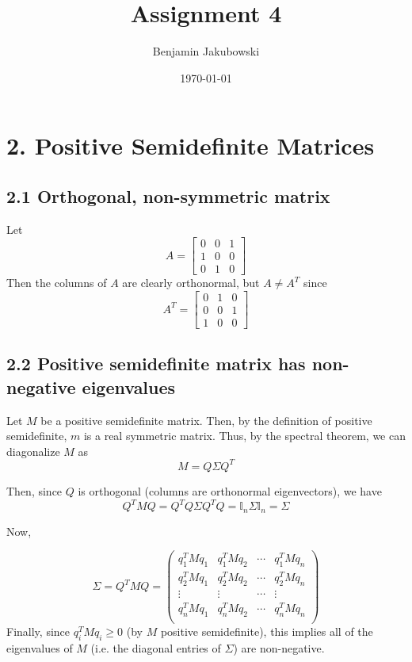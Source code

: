 \documentclass[paper=a4, fontsize=11pt]{scrartcl} %
\title{	Assignment 4}
\author{Benjamin Jakubowski} %
\date{\normalsize\today} %
\numberwithin{equation}{section} %
\numberwithin{figure}{section} %
\numberwithin{table}{section} %
\begin{document}
\maketitle %


\section*{2. Positive Semidefinite Matrices}
\subsection*{2.1 Orthogonal, non-symmetric matrix}

Let
\[A = \left[
\begin{matrix}
	0 & 0 & 1 \\
	1 & 0 & 0 \\
	0 & 1 & 0
\end{matrix}
\right]
\]
Then the columns of $A$ are clearly orthonormal, but $A \ne A^T$ since
\[A^T = \left[
\begin{matrix}
	0 & 1 & 0 \\
	0 & 0 & 1 \\
	1 & 0 & 0
\end{matrix}
\right]
\]

\subsection*{2.2 Positive semidefinite matrix has non-negative eigenvalues}

Let $M$ be a positive semidefinite matrix. Then, by the definition of positive semidefinite, $m$ is a real symmetric matrix. Thus, by the spectral theorem, we can diagonalize $M$ as
\[M = Q \Sigma Q^T\]

Then, since $Q$ is orthogonal (columns are orthonormal eigenvectors), we have
\[Q^TMQ = Q^T Q \Sigma Q^T Q = \mathbb{I}_n \Sigma \mathbb{I}_n = \Sigma\]

Now,

\[\Sigma = Q^TMQ = \left(
\begin{matrix}
	q_1^TMq_1 & q_1^TMq_2 & \cdots & q_1^TMq_n \\ 
	q_2^TMq_1 & q_2^TMq_2 & \cdots & q_2^TMq_n \\ 
	\vdots & \vdots & \cdots & \vdots \\
	q_n^TMq_1 & q_n^TMq_2 & \cdots & q_n^TMq_n \\ 
\end{matrix}
\right)
\]
Finally, since $q_i^T M q_i \geq 0$ (by $M$ positive semidefinite), this implies all of the eigenvalues of $M$ (i.e. the diagonal entries of $\Sigma$) are non-negative.
\end{document}
